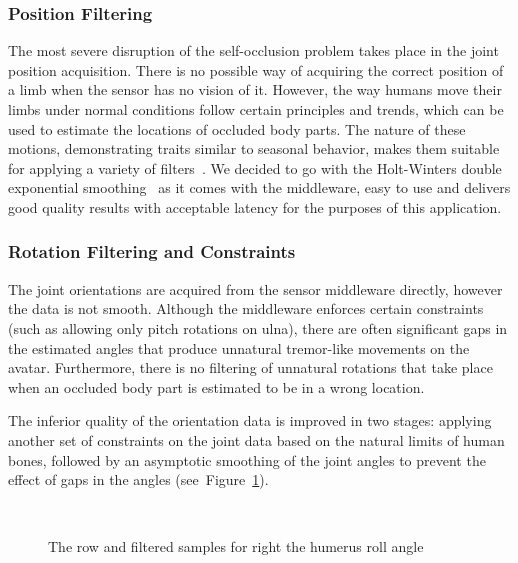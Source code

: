 \documentclass[number,preprint,review,12pt]{elsarticle}
\begin{document}
\subsubsection{Position Filtering}
The most severe disruption of the self-occlusion problem takes place in the joint position acquisition. There is no possible way of acquiring the correct position of a limb when the sensor has no vision of it. However, the way humans move their limbs under normal conditions follow certain principles and trends, which can be used to estimate the locations of occluded body parts. The nature of these motions, demonstrating traits similar to seasonal behavior, makes them suitable for applying a variety of filters~\cite{Azimi2012}. We decided to go with the Holt-Winters double exponential smoothing~\cite{Holt1957,Kalekar2004} as it comes with the middleware, easy to use and delivers good quality results with acceptable latency for the purposes of this application. 

\subsubsection{Rotation Filtering and Constraints}
The joint orientations are acquired from the sensor middleware directly, however the data is not smooth. Although the middleware enforces certain constraints (such as allowing only pitch rotations on ulna), there are often significant gaps in the estimated angles that produce unnatural tremor-like movements on the avatar. Furthermore, there is no filtering of unnatural rotations that take place when an occluded body part is estimated to be in a wrong location. 

The inferior quality of the orientation data is improved in two stages: applying another set of constraints on the joint data based on the natural limits of human bones, followed by an asymptotic smoothing of the joint angles to prevent the effect of gaps in the angles (see~Figure~\ref{fig:rotation-filter}). 

\begin{figure}[htbp]
	\centerline{
	}
\centerline{\ }
\caption{The row and filtered samples for right the humerus roll angle}
	\label{fig:rotation-filter}
\end{figure}
\end{document}

